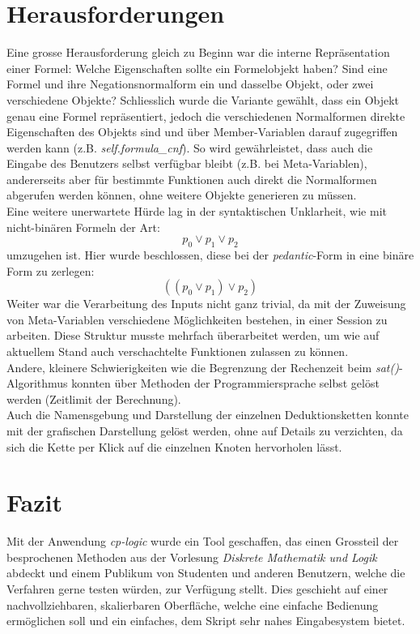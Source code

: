 \documentclass[11pt,a4paper,ngerman]{scrreprt}
\begin{document}
\section{Herausforderungen}
Eine grosse Herausforderung gleich zu Beginn war die interne Repräsentation einer Formel: Welche Eigenschaften sollte ein Formelobjekt haben? Sind eine Formel und ihre Negationsnormalform ein und dasselbe Objekt, oder zwei verschiedene Objekte? Schliesslich wurde die Variante gewählt, dass ein Objekt genau eine Formel repräsentiert, jedoch die verschiedenen Normalformen direkte Eigenschaften des Objekts sind und über Member-Variablen darauf zugegriffen werden kann (z.B. \textit{self.formula\_cnf}). So wird gewährleistet, dass auch die Eingabe des Benutzers selbst verfügbar bleibt (z.B. bei Meta-Variablen), andererseits aber für bestimmte Funktionen auch direkt die Normalformen abgerufen werden können, ohne weitere Objekte generieren zu müssen.\\
Eine weitere unerwartete Hürde lag in der syntaktischen Unklarheit, wie mit nicht-binären Formeln der Art:
\begin{equation}
p_0 \vee p_1 \vee p_2
\end{equation}
umzugehen ist. Hier wurde beschlossen, diese bei der \textit{pedantic}-Form in eine binäre Form zu zerlegen:
\begin{equation}
((p_0 \vee p_1) \vee p_2)
\end{equation}
Weiter war die Verarbeitung des Inputs nicht ganz trivial, da mit der Zuweisung von Meta-Variablen verschiedene Möglichkeiten bestehen, in einer Session zu arbeiten. Diese Struktur musste mehrfach überarbeitet werden, um wie auf aktuellem Stand auch verschachtelte Funktionen zulassen zu können. \\
Andere, kleinere Schwierigkeiten wie die Begrenzung der Rechenzeit beim \textit{sat()}-Algorithmus konnten über Methoden der Programmiersprache selbst gelöst werden (Zeitlimit der Berechnung).\\
Auch die Namensgebung und Darstellung der einzelnen Deduktionsketten konnte mit der grafischen Darstellung gelöst werden, ohne auf Details zu verzichten, da sich die Kette per Klick auf die einzelnen Knoten hervorholen lässt.

\section{Fazit}
Mit der Anwendung \textit{cp-logic} wurde ein Tool geschaffen, das einen Grossteil der besprochenen Methoden aus der Vorlesung \textit{Diskrete Mathematik und Logik} abdeckt und einem Publikum von Studenten und anderen Benutzern, welche die Verfahren gerne testen würden, zur Verfügung stellt. Dies geschieht auf einer nachvollziehbaren, skalierbaren Oberfläche, welche eine einfache Bedienung ermöglichen soll und ein einfaches, dem Skript sehr nahes Eingabesystem bietet.
\end{document}
